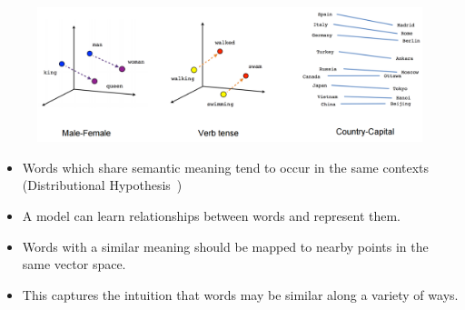 \documentclass[11pt, a4paper, landscape]{article}
\begin{document}
\NewPage{} 
\hypertarget{sli:word-embeddings}{}

\vfill
\begin{figure}[H]
\begin{center}
  \includegraphics[width=.8\textwidth]{../article/img/linear-relationships}
  \label{fig:linear-relationships}
\end{center}
\end{figure}
\begin{itemize}
\item Words which share semantic meaning tend to occur in the same contexts (Distributional Hypothesis~\cite{Sahlgren2008})
\item A model can learn relationships between words and represent them.
\item Words with a similar meaning should be mapped to nearby points in the same vector space.
\item This captures the intuition that words may be similar along a variety of ways.
\end{itemize}
\vfill

\NewPage{}
\hypertarget{sli:simple}{}
\end{document}
